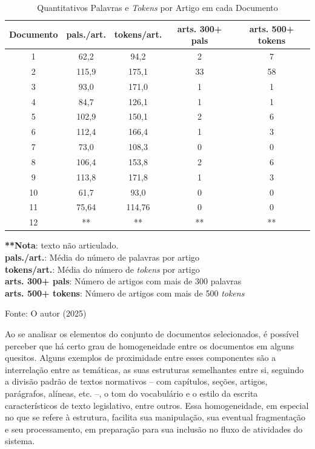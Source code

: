\begin{table}
    \caption{Quantitativos Palavras e \textit{Tokens} por Artigo em cada Documento}
    {
        \centering
        \begin{tabular}{ c c c c c }
            \hline
            \textbf{Documento} & \textbf{pals./art.} & \textbf{tokens/art.} & \textbf{arts. 300+ pals} & \textbf{arts. 500+ tokens} \\  
            \hline
            1 & 62,2 & 94,2 & 2 & 7 \\
            2 & 115,9 & 175,1 & 33 & 58 \\
            3 & 93,0 & 171,0 & 1 & 1 \\
            4 & 84,7 & 126,1 & 1 & 1 \\
            5 & 102,9 & 150,1 & 2 & 6 \\
            6 & 112,4 & 166,4 & 1 & 3 \\
            7 & 73,0 & 108,3 & 0 & 0 \\
            8 & 106,4 & 153,8 & 2 & 6 \\
            9 & 113,8 & 171,8 & 1 & 3 \\
            10 & 61,7 & 93,0 & 0 & 0 \\
            11 & 75,64 & 114,76 & 0 & 0 \\
            12 & ** & ** & ** & ** \\
            \hline
        \end{tabular}
    }

    \small \textbf{**Nota}: texto não articulado.\\
    \small \textbf{pals./art.}: Média do número de palavras por artigo \\
    \small \textbf{tokens/art.}: Média do número de \textit{tokens} por artigo \\
    \small \textbf{arts. 300+ pals}: Número de artigos com mais de 300 palavras \\
    \small \textbf{arts. 500+ tokens}: Número de artigos com mais de 500 \textit{tokens} \\
    
    {\centering
        Fonte: O autor (2025)\par
    }
    \label{tab:descricao-documentos-2}
\end{table}

Ao se analisar os elementos do conjunto de documentos selecionados, é possível perceber que há certo grau de homogeneidade entre os documentos em alguns quesitos. Alguns exemplos de proximidade entre esses componentes são a interrelação entre as temáticas, as suas estruturas semelhantes entre si, seguindo a divisão padrão de textos normativos -- com capítulos, seções, artigos, parágrafos, alíneas, etc. --, o tom do vocabulário e o estilo da escrita característicos de texto legislativo, entre outros. Essa homogeneidade, em especial no que se refere à estrutura, facilita sua manipulação, sua eventual fragmentação e seu processamento, em preparação para sua inclusão no fluxo de atividades do sistema.

